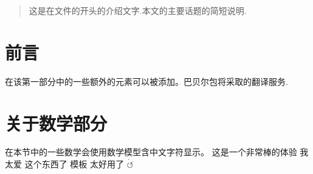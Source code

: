 \documentclass{article}
\begin{document}
\tableofcontents

\begin{abstract}
这是在文件的开头的介绍文字.本文的主要话题的简短说明.
\end{abstract}

\section{ 前言 }
在该第一部分中的一些额外的元素可以被添加。巴贝尔包将采取的翻译服务.

\section{关于数学部分}
在本节中的一些数学会使用数学模型含中文字符显示。
这是一个非常棒的体验
我太爱 这个东西了 模板
太好用了
$ \acute\acwopencirclearrow $
\end{document}
